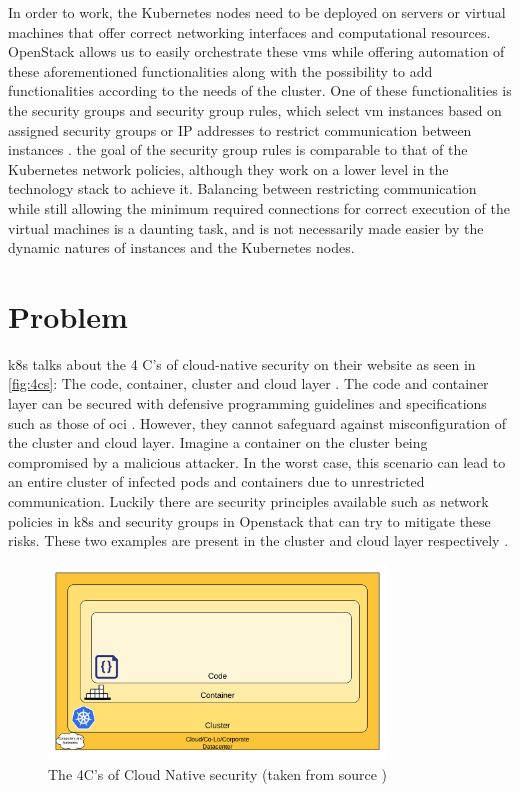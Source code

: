 In order to work, the Kubernetes nodes need to be deployed on servers or virtual machines that offer correct networking interfaces and computational resources. OpenStack allows us to easily orchestrate these \acrshort{vm}s while offering automation of these aforementioned functionalities along with the possibility to add functionalities according to the needs of the cluster. One of these functionalities is the security groups and security group rules, which select \acrshort{vm} instances based on assigned security groups or IP addresses to restrict communication between instances \cite{sg} \cite{sgrule}. the goal of the security group rules is comparable to that of the Kubernetes network policies, although they work on a lower level in the technology stack to achieve it. Balancing between restricting communication while still allowing the minimum required connections for correct execution of the virtual machines is a daunting task, and is not necessarily made easier by the dynamic natures of instances and the Kubernetes nodes.


\section{Problem} \label{sec:problem}
\acrlong{k8s} talks about the 4 C’s of cloud-native security on their website as seen in \autoref{fig:4cs}: The code, container, cluster and cloud layer \cite{4cs}. The code and container layer can be secured with defensive programming guidelines \cite{defensiveprogramming} and specifications such as those of \acrshort{oci} \cite{OCI}. However, they cannot safeguard against misconfiguration of the cluster and cloud layer. Imagine a container on the cluster being compromised by a malicious attacker. In the worst case, this scenario can lead to an entire cluster of infected pods and containers due to unrestricted communication. Luckily there are security principles available such as network policies in \acrshort{k8s} and security groups in Openstack that can try to mitigate these risks. These two examples are present in the cluster and cloud layer respectively \cite{nps} \cite{secgroups}.
\\[10pt]

\begin{figure}[htbp]
  \centering
  \includegraphics[width=0.8\textwidth]{images/4c.png}
  \caption{The 4C's of Cloud Native security (taken from source \cite{4cs})}
  \label{fig:4cs}
\end{figure}

